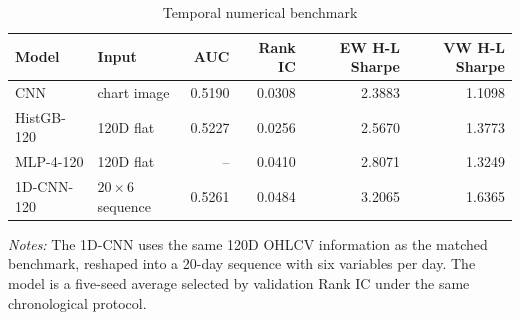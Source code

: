 \begin{table}[htbp]
\centering
\caption{Temporal numerical benchmark}
\label{tab:temporal_benchmark}
\begin{tabular}{llrrrr}
\toprule
Model & Input & AUC & Rank IC & EW H-L Sharpe & VW H-L Sharpe \\
\midrule
CNN & chart image & 0.5190 & 0.0308 & 2.3883 & 1.1098 \\
HistGB-120 & 120D flat & 0.5227 & 0.0256 & 2.5670 & 1.3773 \\
MLP-4-120 & 120D flat & -- & 0.0410 & 2.8071 & 1.3249 \\
1D-CNN-120 & $20\times 6$ sequence & 0.5261 & 0.0484 & 3.2065 & 1.6365 \\
\bottomrule
\end{tabular}
\begin{minipage}{0.94\linewidth}
\footnotesize
\textit{Notes:} The 1D-CNN uses the same 120D OHLCV information as the matched benchmark, reshaped into a 20-day sequence with six variables per day. The model is a five-seed average selected by validation Rank IC under the same chronological protocol.
\end{minipage}
\end{table}
